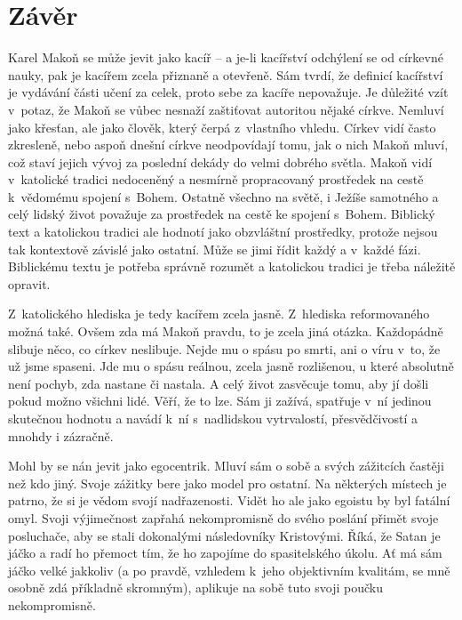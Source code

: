 \chapter{Závěr}

Karel Makoň se může jevit jako kacíř -- a je-li kacířství odchýlení se od
církevné nauky, pak je kacířem zcela přiznaně a otevřeně. Sám tvrdí, že definicí
kacířství je vydávání části učení za celek, proto sebe za kacíře nepovažuje. Je
důležité vzít v~potaz, že Makoň se vůbec nesnaží zaštiťovat autoritou nějaké
církve. Nemluví jako křesťan, ale jako člověk, který čerpá z~vlastního vhledu.
Církev vidí často zkresleně, nebo aspoň dnešní církve neodpovídají tomu, jak o
nich Makoň mluví, což staví jejich vývoj za poslední dekády do velmi dobrého
světla. Makoň vidí v~katolické tradici nedoceněný a nesmírně propracovaný
prostředek na cestě k~vědomému spojení s~Bohem. Ostatně všechno na světě, i
Ježíše samotného a celý lidský život považuje za prostředek na cestě ke spojení
s~Bohem. Biblický text a katolickou tradici ale hodnotí jako obzvláštní
prostředky, protože nejsou tak kontextově závislé jako ostatní. Může se jimi
řídit každý a v~každé fázi. Biblickému textu je potřeba správně rozumět a
katolickou tradici je třeba náležitě opravit.

Z~katolického hlediska je tedy kacířem zcela jasně. Z~hlediska reformovaného
možná také. Ovšem zda má Makoň pravdu, to je zcela jiná otázka. Každopádně
slibuje něco, co církev neslibuje. Nejde mu o spásu po smrti, ani o víru v~to,
že už jsme spaseni. Jde mu o spásu reálnou, zcela jasně rozlišenou, u které
absolutně není pochyb, zda nastane či nastala. A celý život zasvěcuje tomu, aby
jí došli pokud možno všichni lidé. Věří, že to lze. Sám ji zažívá, spatřuje v~ní
jedinou skutečnou hodnotu a navádí k~ní s~nadlidskou vytrvalostí, přesvědčivostí
a mnohdy i zázračně.

Mohl by se nán jevit jako egocentrik. Mluví sám o sobě a svých zážitcích častěji
než kdo jiný. Svoje zážitky bere jako model pro ostatní. Na některých místech je
patrno, že si je vědom svojí nadřazenosti. Vidět ho ale jako egoistu by byl
fatální omyl. Svoji výjimečnost zapřahá nekompromisně do svého poslání přimět
svoje posluchače, aby se stali dokonalými následovníky Kristovými. Říká, že
Satan je jáčko a radí ho přemoct tím, že ho zapojíme do spasitelského úkolu. Ať
má sám jáčko velké jakkoliv (a po pravdě, vzhledem k~jeho objektivním kvalitám,
se mně osobně zdá příkladně skromným), aplikuje na sobě tuto svoji poučku
nekompromisně.

